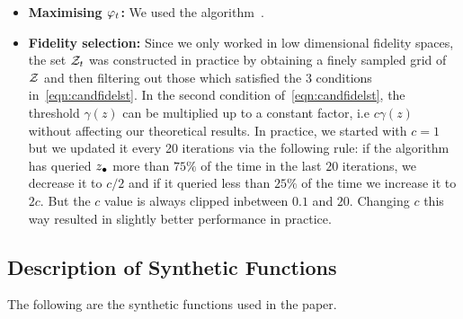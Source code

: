 \begin{itemize}[leftmargin=0.0in]
\vspace{-0.05in}
\item[]
\textbf{Maximising $\varphi_t$:}
We used the \directs algorithm~\citep{jones93direct}.

\item[]
\textbf{Fidelity selection:}
Since we only worked in low dimensional fidelity spaces, the set $\mathcal{Z}_t$
was constructed in practice by obtaining a finely sampled grid of $\mathcal{Z}$ and then
filtering out those which satisfied the $3$ conditions in~\eqref{eqn:candfidelst}.
In the second condition of~\eqref{eqn:candfidelst}, the threshold $\gamma(z)$ can
be multiplied up to a constant factor, i.e $c\gamma(z)$ without affecting our theoretical
results.
In practice, we started with $c=1$ but we updated it every 20 iterations via the following
rule: if the algorithm has queried $z_{\bullet}$ more than $75\%$ of the time in the last $20$
iterations, we decrease it to $c/2$ and if it queried less than $25\%$ of the time
we increase it to $2c$.
But the $c$ value is always clipped inbetween $0.1$ and $20$.
Changing $c$ this way  resulted in slightly better performance in practice.

\end{itemize}


\subsection{Description of Synthetic Functions}
\label{sec:appSynthetic}

The following are the synthetic functions used in the paper.


